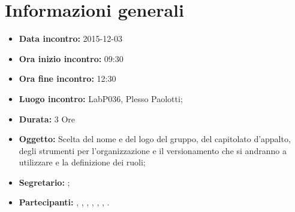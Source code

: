 \newpage
\section{Informazioni generali}
\begin{itemize}
\item \textbf{Data incontro:} 2015-12-03
\item \textbf{Ora inizio incontro:} 09:30
\item \textbf{Ora fine incontro:} 12:30
\item \textbf{Luogo incontro:} LabP036, Plesso Paolotti;
\item \textbf{Durata:} 3 Ore
\item \textbf{Oggetto:} Scelta del nome e del logo del gruppo, del capitolato d'appalto, degli strumenti per l'organizzazione e il versionamento che si andranno a utilizzare e la definizione dei ruoli;
\item \textbf{Segretario:} \AF;
\item \textbf{Partecipanti:} \AF, \FB, \GN, \GR, \MV, \MP, \SM.

\end{itemize}
